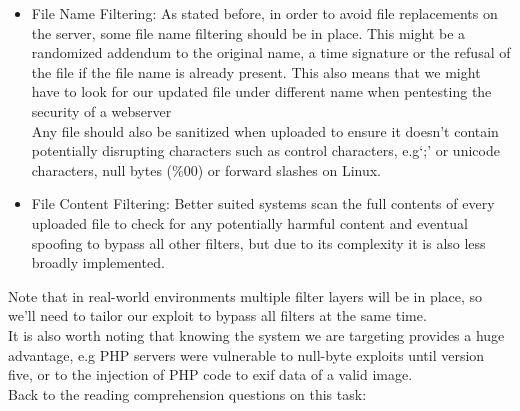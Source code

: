 {\begin{itemize}
\item File Name Filtering: As stated before, in order to avoid file replacements on the server, some file name filtering should be in place. This might be a randomized addendum to the original name, a time signature or the refusal of the file if the file name is already present. This also means that we might have to look for our updated file under different name when pentesting the security of a webserver\\
Any file should also be sanitized when uploaded to ensure it doesn't contain potentially disrupting characters such as control characters, e.g`;' or unicode characters, null bytes (\%00) or forward slashes on Linux.
\item File Content Filtering: Better suited systems scan the full contents of every uploaded file to check for any potentially harmful content and eventual spoofing to bypass all other filters, but due to its complexity it is also less broadly implemented.
\end{itemize}

Note that in real-world environments multiple filter layers will be in place, so we'll need to tailor our exploit to bypass all filters at the same time. \\
It is also worth noting that knowing the system we are targeting provides a huge advantage, e.g PHP servers were vulnerable to null-byte exploits until version five, or to the injection of PHP code to exif data of a valid image. \\

Back to the reading comprehension questions on this task: 
}
